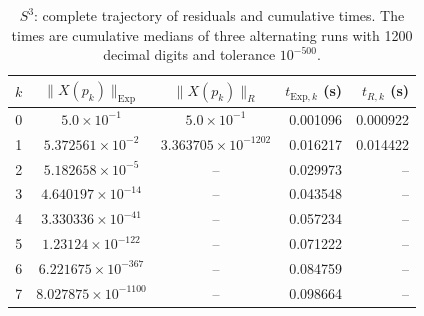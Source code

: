 \documentclass[11pt]{article}
\newcommand{\Exp}{\mathrm{Exp}}
\begin{document}
\begin{table}[H]
\centering
\scriptsize
\setlength{\tabcolsep}{4.2pt}
\begin{tabular}{rccrr}
\toprule
$k$ & $\|X(p_k)\|_{\Exp}$ & $\|X(p_k)\|_R$
& $t_{\Exp,k}$ (s) & $t_{R,k}$ (s)\\
\midrule
0 & $5.0\times10^{-1}$ & $5.0\times10^{-1}$ & 0.001096 & 0.000922 \\
1 & $5.372561\times10^{-2}$ & $3.363705\times10^{-1202}$ & 0.016217 & 0.014422 \\
2 & $5.182658\times10^{-5}$ & -- & 0.029973 & -- \\
3 & $4.640197\times10^{-14}$ & -- & 0.043548 & -- \\
4 & $3.330336\times10^{-41}$ & -- & 0.057234 & -- \\
5 & $1.23124\times10^{-122}$ & -- & 0.071222 & -- \\
6 & $6.221675\times10^{-367}$ & -- & 0.084759 & -- \\
7 & $8.027875\times10^{-1100}$ & -- & 0.098664 & -- \\
\bottomrule
\end{tabular}
\caption{$S^3$: complete trajectory of residuals and cumulative times. The times are cumulative medians of three alternating runs with 1200 decimal digits and tolerance $10^{-500}$.}
\label{tab:supp_s3}
\end{table}
\end{document}
